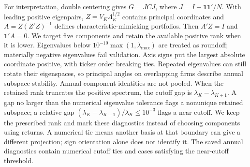 \documentclass[11pt]{article}
\begin{document}
\begin{table}[p]
  \centering\scriptsize\setlength{\tabcolsep}{4pt}
  
  \caption{Complete direct-geometry score grid, 2020--2025. Higher summed
    Gaussian log scores are better. Full scores include model-specific scale
    estimates; marginal scores rescale the complete covariance to the common
    prior raw-return variances. Native and decoded geometries are both
  unit-normalized for this comparison.}
\end{table}

\begin{table}[p]
  \centering\scriptsize\setlength{\tabcolsep}{4pt}
  
  \caption{Direct Gram minus spatial scores with full covariances. Brackets
    give conditional 95\% stationary-bootstrap intervals. All prescribed
  geometries and controls are retained.}
\end{table}

\begin{table}[p]
  \centering\scriptsize\setlength{\tabcolsep}{4pt}
  
  \caption{Direct Gram minus spatial scores with common marginal variances.
    Brackets give conditional 95\% stationary-bootstrap intervals. Positive
  differences favor shared-exposure covariance on the identical geometry.}
\end{table}

For interpretation, double centering gives $G=JCJ$, where
$J=I-\mathbf1\mathbf1'/N$. With leading positive eigenpairs,
$Z=V_K\Lambda_K^{1/2}$ contains principal coordinates and
$A=Z{(Z'Z)}^{-1}$ defines characteristic-mimicking portfolios. Then $A'Z=I$
and $\mathbf1'A=0$. We target five components and retain the available positive
rank when it is lower. Eigenvalues below
$10^{-10}\max(1,\lambda_{\max})$ are treated as roundoff; materially negative
eigenvalues fail validation. Axis signs put the largest absolute coordinate
positive, with ticker order breaking ties. Repeated eigenvalues can still
rotate their eigenspaces, so principal angles on overlapping firms describe
annual subspace stability. Annual component identities are not pooled.
When the retained rank truncates the positive spectrum, the cutoff gap is
$\lambda_K-\lambda_{K+1}$. A gap no larger than the numerical eigenvalue
tolerance flags a nonunique retained subspace; a relative gap
${(\lambda_K-\lambda_{K+1})}/\lambda_K\leq10^{-3}$ flags a near cutoff.
We keep the prescribed rank and mark these diagnostics instead of choosing
components using returns. A numerical tie means another basis at that boundary
can give a different projection; sign orientation alone does not identify it.
The saved annual diagnostics contain \PcoaCutoffTies{} numerical cutoff ties
and \PcoaCutoffNear{} cases satisfying the near-cutoff threshold.
\end{document}
